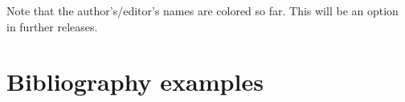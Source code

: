 \documentclass[DIV=11]{scrartcl}
\begin{document}

Note that the author’s/editor’s names are colored so far.
This will be an option in further releases.


\section{Bibliography examples}
\nocite{*} 
\begin{bibexample}[breakable]
\printbibliography
\end{bibexample}
\end{document}
